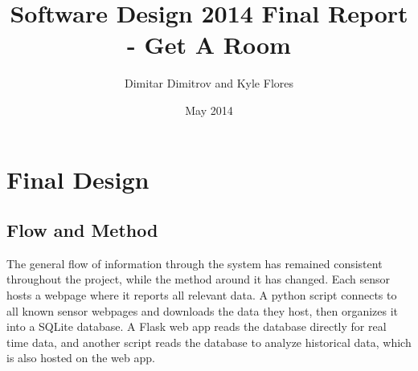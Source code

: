 \documentclass{article}
\title{Software Design 2014 Final Report - Get A Room}
\author{Dimitar Dimitrov and Kyle Flores}
\date{May 2014}
\begin{document}
\maketitle

\section*{Final Design}
\subsection*{Flow and Method}
\par The general flow of information through the system has remained consistent throughout the project, while the method around it has changed. Each sensor hosts a webpage where it reports all relevant data. A python script connects to all known sensor webpages and downloads the data they host, then organizes it into a SQLite database. A Flask web app reads the database directly for real time data, and another script reads the database to analyze historical data, which is also hosted on the web app.
\end{document}
